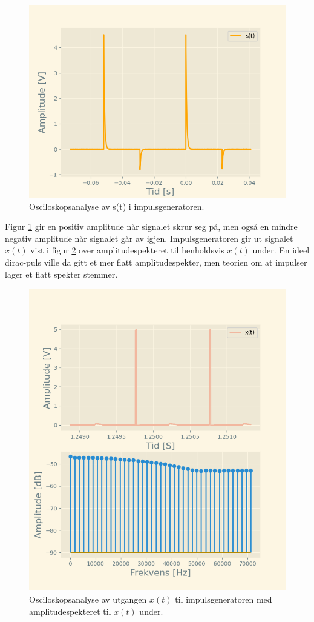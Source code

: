 \documentclass[a4paper,11pt,norsk]{article}
\begin{document}
\begin{figure}[H]
  \centering
  \includegraphics[scale=0.65]{D1/Images/s(t).png}
  \caption{Osciloskopsanalyse av s(t) i impulsgeneratoren.}
  \label{fig:s(t)}
\end{figure}
Figur \ref{fig:s(t)} gir en positiv amplitude når signalet skrur seg på, men også en mindre negativ amplitude når signalet går av igjen. 
Impulsgeneratoren gir ut signalet $x(t)$ vist i figur \ref{fig:x(t)} over amplitudespekteret til henholdsvis $x(t)$ under. En ideel dirac-puls ville da gitt et mer flatt amplitudespekter, men teorien om at impulser lager et flatt spekter stemmer.
\begin{figure}[H]
  \centering
  \includegraphics[scale=0.65]{D1/Images/x(t).png}
  \caption{Osciloskopsanalyse av utgangen $x(t)$ til impulsgeneratoren med amplitudespekteret til $x(t)$ under.}
  \label{fig:x(t)}
\end{figure}
\end{document}
